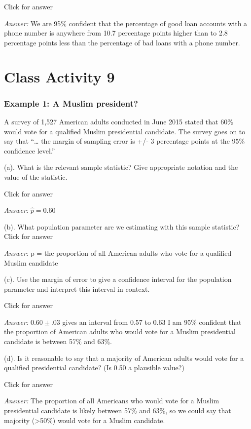 \documentclass[
]{book}
\begin{document}
Click for answer

\emph{Answer:} We are 95\% confident that the percentage of good loan accounts with a phone number is anywhere from 10.7 percentage points higher than to 2.8 percentage points less than the percentage of bad loans with a phone number.

\hypertarget{class-activity-9}{%
\chapter{Class Activity 9}\label{class-activity-9}}

\hypertarget{example-1-a-muslim-president}{%
\subsection{Example 1: A Muslim president?}\label{example-1-a-muslim-president}}

A survey of 1,527 American adults conducted in June 2015 stated that 60\% would vote for a qualified Muslim presidential candidate. The survey goes on to say that ``\ldots{} the margin of sampling error is +/- 3 percentage points at the 95\% confidence level.''

(a). What is the relevant sample statistic? Give appropriate notation and the value of the statistic.

Click for answer

\emph{Answer:} \(\hat{p} = 0.60\)

(b). What population parameter are we estimating with this sample statistic?\\

Click for answer

\emph{Answer:} p = the proportion of all American adults who vote for a qualified Muslim candidate

(c). Use the margin of error to give a confidence interval for the population parameter and interpret this interval in context.

Click for answer

\emph{Answer:} \(0.60 \pm .03\) gives an interval from 0.57 to 0.63
I am 95\% confident that the proportion of American adults who would vote for a Muslim presidential candidate is between 57\% and 63\%.

(d). Is it reasonable to say that a majority of American adults would vote for a qualified presidential candidate? (Is 0.50 a plausible value?)

Click for answer

\emph{Answer:} The proportion of all Americans who would vote for a Muslim presidential candidate is likely between 57\% and 63\%, so we could say that majority (\textgreater50\%) would vote for a Muslim candidate.
\end{document}
